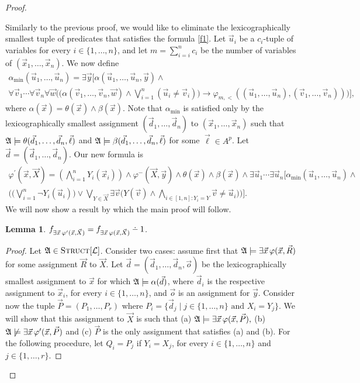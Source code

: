 \documentclass[12pt]{article}
\def\dotminus{\mathbin{\ooalign{\hss\raise1ex\hbox{.}\hss\cr
  \mathsurround=0pt$-$}}}
\def\Truc{\textsc{Struct}[\L]}
\def\A{{\frak A}}
\def\L{{\cal L}}
\def\P{\vec{P}}
\def\R{\vec{R}}
\def\X{\vec{X}}
\def\d{\vec{d}} %
\def\l{\vec{\ell}}
\def\u{\vec{u}} %
\def\v{\vec{v}} %
\def\w{\vec{w}} %
\def\x{\vec{x}} %
\def\y{\vec{y}} %
\def\ep{\vec{o}}
\newtheorem{lemma}[theo]{Lemma}
\begin{document}
\begin{proof}
\begin{enumerate}
Similarly to the previous proof, we would like to eliminate the lexicographically smallest tuple of predicates that satisfies the formula \eqref{f1}. Let $\u_i$ be a $c_i$-tuple of variables for every $i \in \{1,\dots,n\}$, and let $m = \sum_{i = i}^n c_i$ be the number of variables of $(\x_1,\dots,\x_n)$. We now define
\begin{multline*}
\alpha_{\min}(\u_1,\dots,\u_n) = \exists\y\Big[ \alpha(\u_1,\dots,\u_n,\y)\wedge \\ \forall\v_1\cdots\forall\v_n\forall\w\Big(\big(\alpha(\v_1,\dots,\v_n,\w)\wedge\bigvee_{i=1}^n(\u_i\neq\v_i)\big)\to \varphi_{m,<}((\u_1,\dots,\u_n),(\v_1,\dots,\v_n))\Big)\Big],
\end{multline*}
where $\alpha(\x) = \theta(\x) \wedge \beta(\x)$. Note that $\alpha_{\min}$ is satisfied only by the lexicographically \linebreak smallest assignment $(\d_1,\dots,\d_n)$ to $(\x_1,\dots,\x_n)$ such that $\A\models\theta(\d_1,\dots,\d_n,\l)$ and $\A\models\beta(\d_1,\dots,\d_n,\l)$ for some $\l \in A^p$. Let $\d = (\d_1,\dots,\d_n)$. Our new formula is
\begin{multline}
\varphi^\prime(\x,\X) = \left( \bigwedge_{i=1}^n Y_i(\x_i) \right) \wedge \varphi^{-}(\X,\y) \wedge \theta(\x) \wedge \beta(\x)\wedge\exists\u_1\cdots\exists\u_n\bigg[\alpha_{\min}(\u_1,\dots,\u_n) \wedge \\ \bigg(\bigg(\bigvee_{i = 1}^{n}\neg Y_i(\u_i) \bigg) \vee \bigvee_{Y\in\X} \exists \v\Big( Y(\v) \wedge \bigwedge_{i\in[1,n]: Y_i = Y} \v \neq \u_i\Big) \bigg) \bigg] \label{f2}.
\end{multline}
We will now show a result by which the main proof will follow.
\begin{lemma}  \label{lemmaone}
$f_{\exists \x \: \varphi^\prime(\x,\X)} = f_{\exists \x \: \varphi(\x,\X)} \dotminus 1$.
\end{lemma}
\begin{proof}
Let $\A \in \Truc$. Consider two cases: assume first that $\A\models\exists\x\,\varphi(\x,\R)$ for some assignment $\R$ to $\X$. Let $\d = (\d_1,\dots,\d_n,\ep)$ be the lexicographically smallest assignment to $\x$ for which $\A\models\alpha(\d)$, where $\d_i$ is the respective assignment to $\x_i$, for every $i\in\{1,\dots,n\}$, and $\ep$ is an assignment for $\y$. Consider now the tuple $\P = (P_1,\dots,P_r)$ where $P_i = \{\d_j \mid j\in\{1,\dots,n\} \text{ and } X_i = Y_j \}$. We will show that this assignment to $\X$ is such that (a) $\A\models\exists\x\,\varphi(\x,\P),$ (b) $\A\not\models\exists\x\,\varphi^\prime(\x,\P)$ and (c) $\P$ is the only assignment that satisfies (a) and (b). For the following procedure, let $Q_i = P_j$ if $Y_i = X_j$, for every $i \in \{1,\ldots,n\}$ and $j \in \{1,\ldots,r\}.$

\end{proof}
\end{enumerate}
\end{proof}
\end{document}
